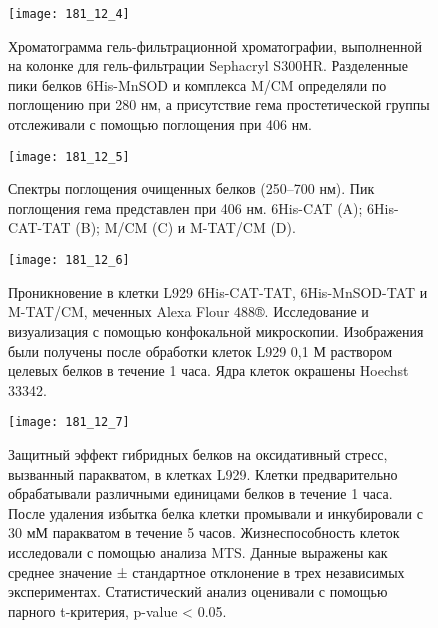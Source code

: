 \begin{figure}[H]
	\centering
	\texttt{[image: 181\_12\_4]}
	\caption{Хроматограмма гель-фильтрационной хроматографии, выполненной на колонке для гель-фильтрации Sephacryl S300HR. Разделенные пики белков 6His-MnSOD и комплекса M/CM определяли по поглощению при 280 нм, а присутствие гема простетической группы отслеживали с помощью поглощения при 406 нм.}
	\label{fig:181_12_4}		
\end{figure}

\begin{figure}[H]
	\centering
	\texttt{[image: 181\_12\_5]}
	\caption{Спектры поглощения очищенных белков (250–700 нм). Пик поглощения гема представлен при 406 нм. 6His-CAT (A); 6His-CAT-TAT (B); M/CM (C) и M-TAT/CM (D).}
	\label{fig:181_12_5}		
\end{figure}


\begin{figure}[H]
	\centering
	\texttt{[image: 181\_12\_6]}
	\caption{Проникновение в клетки L929 6His-CAT-TAT, 6His-MnSOD-TAT и M-TAT/CM, меченных Alexa Flour 488®. Исследование и визуализация с помощью конфокальной микроскопии. Изображения были получены после обработки клеток L929 0,1 М раствором целевых белков в течение 1 часа. Ядра клеток окрашены Hoechst 33342.}
	\label{fig:181_12_6}		
\end{figure}

\begin{figure}[H]
	\centering
	\texttt{[image: 181\_12\_7]}
	\caption{Защитный эффект гибридных белков на оксидативный стресс, вызванный паракватом, в клетках L929. Клетки предварительно обрабатывали различными единицами белков в течение 1 часа. После удаления избытка белка клетки промывали и инкубировали с 30 мМ паракватом в течение 5 часов. Жизнеспособность клеток исследовали с помощью анализа MTS. Данные выражены как среднее значение ± стандартное отклонение в трех независимых экспериментах. Статистический анализ оценивали с помощью парного t-критерия, p-value < 0.05.}
	\label{fig:181_12_7}		
\end{figure}